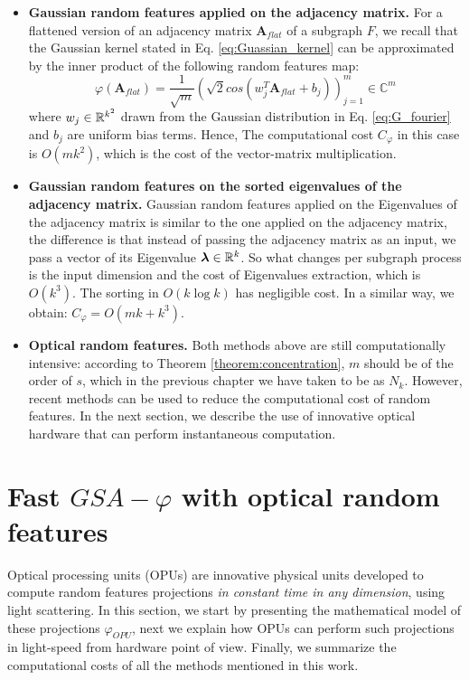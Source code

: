 \begin{itemize}
\item \textbf{Gaussian random features applied on the adjacency matrix.} For a flattened version of an adjacency matrix $\mathbf{A}_{flat}$ of a subgraph $F$, we recall that the Gaussian kernel stated in Eq. \ref{eq:Guassian_kernel} can be approximated by the inner product of the following random features map:
\[
\varphi(\mathbf{A}_{flat}) = \frac{1}{\sqrt{m}} ( \sqrt{2}cos(w_j^T\mathbf{A}_{flat}+b_j) )_{j=1}^m \in \mathbb{C}^m
\]
where $w_j\in\mathbb{R}^{k^2}$ drawn from the Gaussian distribution in Eq. \ref{eq:G_fourier} and $b_j$ are uniform bias terms. Hence, The computational cost $C_\varphi$ in this case is $O(mk^2)$, which is the cost of the vector-matrix multiplication.
\item \textbf{Gaussian random features on the sorted eigenvalues of the adjacency matrix.} Gaussian random features applied on the Eigenvalues of the adjacency matrix is similar to the one applied on the adjacency matrix, the difference is that instead of passing the adjacency matrix as an input, we pass a vector of its Eigenvalue $\boldsymbol{\lambda}\in\mathbb{R}^k$. So what changes per subgraph process is the input dimension and the cost of Eigenvalues extraction, which is $O(k^3)$. The sorting in $O(k \log k)$ has negligible cost. In a similar way, we obtain: $C_{\varphi}=O(mk+k^3)$.
\item \textbf{Optical random features.} Both methods above are still computationally intensive: according to Theorem \ref{theorem:concentration}, $m$ should be of the order of $s$, which in the previous chapter we have taken to be as $N_k$. However, recent methods can be used to reduce the computational cost of random features. In the next section, we describe the use of innovative optical hardware that can perform instantaneous computation.
\end{itemize}


\section{Fast $GSA-\varphi$ with optical random features}
\label{section:OPU}
Optical processing units (OPUs) are innovative physical units developed to compute random features projections \emph{in constant time in any dimension}, using light scattering. In this section, %
we start by presenting the mathematical model of these projections $\varphi_{OPU}$, next we explain how OPUs can perform such projections in light-speed from hardware point of view. Finally, we summarize the computational costs of all the methods mentioned in this work.

